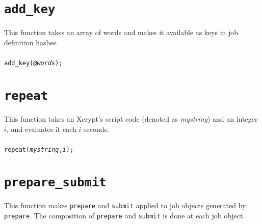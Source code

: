 \documentclass[a4paper,10pt]{report}
\begin{document}


\section{\texttt{add\_key}}

This function takes an array of words and makes it available as keys in job
definition hashes.

\subsubsection{\format}

\begin{boxnote}
\begin{alltt}
add_key(@\textit{words});
\end{alltt}
\end{boxnote}
\vspace{\baselineskip}

\section{\texttt{repeat}}

This function takes an Xcrypt's script code (denoted as
\textit{mystring}) and an integer $i$, and evaluates it each $i$ seconds.

\subsubsection{\format}

\begin{boxnote}
\begin{alltt}
repeat(\textit{mystring}, \textit{i});
\end{alltt}
\end{boxnote}
\vspace{\baselineskip}

\section{\texttt{prepare\_submit}}

This function makes \texttt{prepare} and \texttt{submit} applied to
job objects generated by \texttt{prepare}.  The composition of
\texttt{prepare} and \texttt{submit} is done at each job object.
\end{document}
